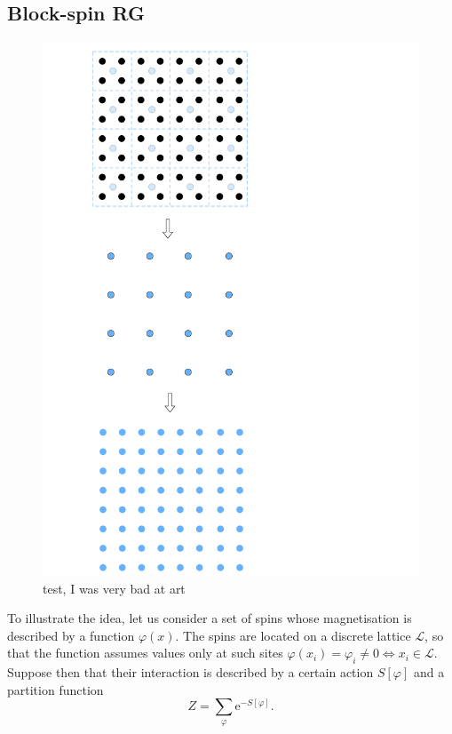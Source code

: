 \subsection*{Block-spin RG}
\label{sec:blockspin}
\begin{figure}
    \centering 
    \includegraphics[angle=90,scale=0.34]{figures/test.pdf}
    \caption{test, I was very bad at art}
    \label{fig:blockin_first}
\end{figure}
To illustrate the idea, let us consider a set of spins whose magnetisation is described by a function $\varphi(x)$. The spins are located on a discrete lattice $\mathscr{L}$, so that the function assumes values only at such sites $\varphi(x_i) = \varphi_i \neq 0 \Leftrightarrow x_i \in \mathscr{L}$. Suppose then that their interaction is described by a certain action $S[\varphi]$ and a partition function
\begin{equation*}
    Z=\sum_{\varphi} \mathrm{e}^{-S[\varphi]}.
\end{equation*}
